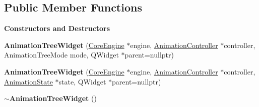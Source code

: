 \subsection*{Public Member Functions}
\begin{Indent}\textbf{ Constructors and Destructors}\par
\begin{DoxyCompactItemize}
\item 
\mbox{\label{classrev_1_1_view_1_1_animation_tree_widget_a0e256298a188dd10bbfdc51bdded2af8}} 
{\bfseries Animation\+Tree\+Widget} (\mbox{\hyperlink{classrev_1_1_core_engine}{Core\+Engine}} $\ast$engine, \mbox{\hyperlink{classrev_1_1_animation_controller}{Animation\+Controller}} $\ast$controller, Animation\+Tree\+Mode mode, Q\+Widget $\ast$parent=nullptr)
\item 
\mbox{\label{classrev_1_1_view_1_1_animation_tree_widget_a63d4b23cd69a172a51252fe413e3349b}} 
{\bfseries Animation\+Tree\+Widget} (\mbox{\hyperlink{classrev_1_1_core_engine}{Core\+Engine}} $\ast$engine, \mbox{\hyperlink{classrev_1_1_animation_controller}{Animation\+Controller}} $\ast$controller, \mbox{\hyperlink{classrev_1_1_animation_state}{Animation\+State}} $\ast$state, Q\+Widget $\ast$parent=nullptr)
\item 
\mbox{\label{classrev_1_1_view_1_1_animation_tree_widget_a27af0f7c6d21c4e78bcf1785b766107d}} 
{\bfseries $\sim$\+Animation\+Tree\+Widget} ()
\end{DoxyCompactItemize}
\end{Indent}
